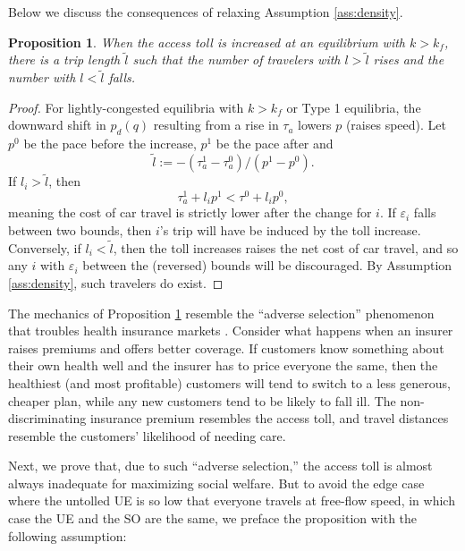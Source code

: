 \documentclass[preprint,authoryear]{elsarticle}
\newcommand{\taua}{\tau_a}
\newcommand{\ve}{\varepsilon}
\newcommand{\ltilde}{\tilde{l}}
\newtheorem{proposition}{Proposition}
\begin{document}
\noindent Below we discuss the consequences of relaxing Assumption \ref{ass:density}.

\begin{proposition}\label{prop:adverse}
When the access toll is increased at an equilibrium with $k>k_f$, there is a trip length $\ltilde$ such that the number of travelers with $l>\tilde{l}$ rises and the number with $l<\tilde{l}$ falls.
\end{proposition}
\begin{proof}
	For lightly-congested equilibria with $k>k_f$ or Type 1 equilibria, the downward shift in $p_d(q)$ resulting from a rise in $\taua$ lowers $p$ (raises speed). Let $p^0$ be the pace before the increase, $p^1$ be the pace after and 
	\begin{equation}
	\ltilde := -(\taua^1 - \taua^0)/(p^1-p^0).	
	\end{equation}
	If $l_i > \ltilde$, then
	\begin{equation}
		\taua^1 + l_i p^1 < \tau^0 + l_i p^0,
	\end{equation}
	meaning the cost of car travel is strictly lower after the change for $i$. If $\ve_i$ falls between two bounds, then $i$'s trip will have be induced by the toll increase. Conversely, if $l_i<\ltilde$, then the toll increases raises the net cost of car travel, and so any $i$ with $\ve_i$ between the (reversed) bounds will be discouraged. By Assumption \ref{ass:density}, such travelers do exist.
\end{proof}

The mechanics of Proposition \ref{prop:adverse} resemble the ``adverse selection'' phenomenon that troubles health insurance markets \citep{Akerlof1970a}. Consider what happens when an insurer raises premiums and offers better coverage. If customers know something about their own health well and the insurer has to price everyone the same, then the healthiest (and most profitable) customers will tend to switch to a less generous, cheaper plan, while any new customers tend to be likely to fall ill. The non-discriminating insurance premium resembles the access toll, and travel distances resemble the customers' likelihood of needing care.

Next, we prove that, due to such ``adverse selection,'' the access toll is almost always inadequate for maximizing social welfare. But to avoid the edge case where the untolled UE is so low that everyone travels at free-flow speed, in which case the UE and the SO are the same, we preface the proposition with the following assumption:
\end{document}
